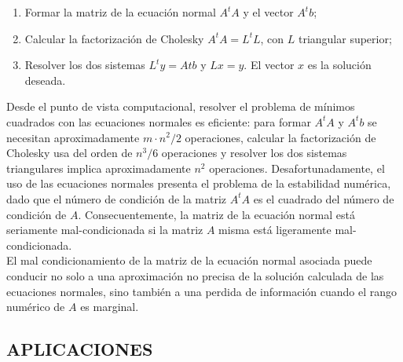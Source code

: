 \documentclass[twocolumn,twoside]{article}
\begin{document}
\begin{enumerate}[label=(\roman*)]

      \item Formar la matriz de la ecuaci\'on normal $A^t A$ y el vector $A^t b$;
      \item Calcular la factorizaci\'on de Cholesky $A^t A = L^t L$, con $L$ triangular superior;
      \item Resolver los dos sistemas $L^t y = A t b$ y $L x = y$. El vector $x$ es la soluci\'on deseada.
  

\end{enumerate}
Desde el punto de vista computacional, resolver el problema de m\'inimos cuadrados
con las ecuaciones normales es eficiente: para formar $A^t A$ y $A^t b$ se necesitan aproximadamente
$ m\cdot n^2/2$ operaciones, calcular la factorizaci\'on de Cholesky usa del orden de $n^3 /6$
operaciones y resolver los dos sistemas triangulares implica aproximadamente $n^2$ operaciones.
Desafortunadamente, el uso de las ecuaciones normales presenta el problema de la
estabilidad num\'erica, dado que el n\'umero de condici\'on de la matriz $A^t A$ es el cuadrado
del n\'umero de condici\'on de $A$. Consecuentemente, la matriz de la ecuaci\'on normal est\'a
seriamente mal-condicionada si la matriz $A$ misma est\'a ligeramente mal-condicionada.\\
El mal condicionamiento de la matriz de la ecuaci\'on normal asociada puede conducir
no solo a una aproximaci\'on no precisa de la soluci\'on calculada de las ecuaciones normales,
sino tambi\'en a una perdida de informaci\'on cuando el rango num\'erico de $A$ es marginal.
\subsection{APLICACIONES}
\end{document}
